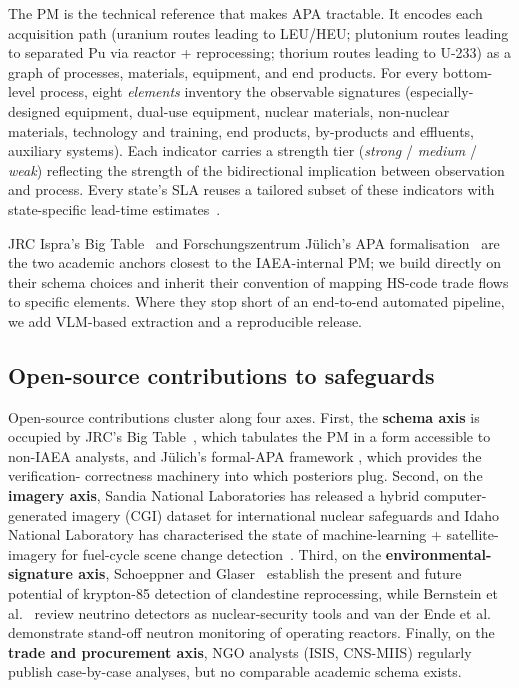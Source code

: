 \documentclass[11pt,a4paper]{article}
\begin{document}
The PM is the technical reference that makes APA tractable. It encodes
each acquisition path (uranium routes leading to LEU/HEU; plutonium
routes leading to separated Pu via reactor + reprocessing; thorium
routes leading to U-233) as a graph of processes, materials, equipment,
and end products. For every bottom-level process, eight \emph{elements}
inventory the observable signatures (especially-designed equipment,
dual-use equipment, nuclear materials, non-nuclear materials,
technology and training, end products, by-products and effluents,
auxiliary systems). Each indicator carries a strength tier
(\emph{strong} / \emph{medium} / \emph{weak}) reflecting the strength of
the bidirectional implication between observation and process. Every
state's SLA reuses a tailored subset of these indicators with
state-specific lead-time estimates~\cite{Listner2013,Allen2021}.

JRC Ispra's Big Table~\cite{Renda2014,Renda2015} and Forschungszentrum
J\"ulich's APA formalisation~\cite{Listner2013,Allen2021} are the two
academic anchors closest to the IAEA-internal PM; we build directly on
their schema choices and inherit their convention of mapping HS-code
trade flows to specific elements. Where they stop short of an
end-to-end automated pipeline, we add VLM-based extraction and a
reproducible release.

\subsection{Open-source contributions to safeguards}

Open-source contributions cluster along four axes. First, the
\textbf{schema axis} is occupied by JRC's Big
Table~\cite{Renda2014,Renda2015}, which tabulates the PM in a form
accessible to non-IAEA analysts, and J\"ulich's formal-APA framework
\cite{Listner2013,Allen2021}, which provides the verification-
correctness machinery into which posteriors plug. Second, on the
\textbf{imagery axis}, Sandia
National Laboratories has released a hybrid computer-generated
imagery (CGI) dataset for international nuclear safeguards
\cite{Gastelum2024} and Idaho National Laboratory has
characterised the state of machine-learning + satellite-imagery for
fuel-cycle scene change detection~\cite{Elliott2023}. Third, on the
\textbf{environmental-signature axis}, Schoeppner and
Glaser~\cite{Schoeppner2016} establish the present and future
potential of krypton-85 detection of clandestine reprocessing, while
Bernstein et al.~\cite{Bernstein2020} review neutrino detectors as
nuclear-security tools and van der Ende
et al.~\cite{vanderEnde2019} demonstrate stand-off neutron monitoring of
operating reactors. Finally, on the \textbf{trade and procurement
axis}, NGO analysts (ISIS, CNS-MIIS) regularly publish case-by-case
analyses, but no comparable academic schema exists.
\end{document}
